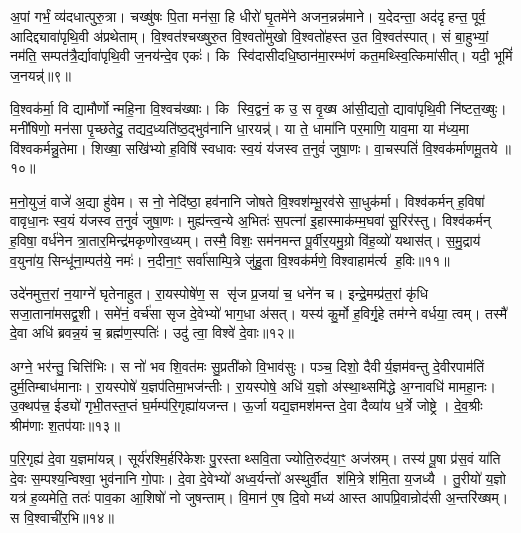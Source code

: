 अ॒पां गर्भं॒ व्य॑दधात्पुरु॒त्रा। चख्षु॑षः पि॒ता मन॑सा॒ हि धीरो॑ घृ॒तमे॑ने अजन॒न्नन्न॑माने। य॒देदन्ता॒ अद॑दृहन्त॒ पूर्व॒ आदिद्द्यावा॑पृथि॒वी अ॑प्रथेताम्। वि॒श्वत॑श्चख्षुरु॒त वि॒श्वतो॑मुखो वि॒श्वतो॑हस्त उ॒त वि॒श्वत॑स्पात्। सं बा॒हुभ्यां॒ नम॑ति॒ सम्पत॑त्रै॒र्द्यावा॑पृथि॒वी ज॒नय॑न्दे॒व एकः॑। कि स्वि॑दासीदधि॒ष्ठान॑मा॒रम्भ॑णं कत॒मथ्स्वि॒त्किमा॑सीत्। यदी॒ भूमिं॑ ज॒नयन्न्॑॥९॥

वि॒श्वक॑र्मा॒ वि द्यामौर्णोन्महि॒ना वि॒श्वच॑ख्षाः। कि स्वि॒द्वनं॒ क उ॒ स वृ॒ख्ष आ॑सी॒द्यतो॒ द्यावा॑पृथि॒वी नि॑ष्टत॒ख्षुः। मनी॑षिणो॒ मन॑सा पृ॒च्छतेदु॒ तद्यद॒ध्यति॑ष्ठ॒द्भुव॑नानि धा॒रयन्न्॑। या ते॒ धामा॑नि पर॒माणि॒ याव॒मा या म॑ध्य॒मा वि॑श्वकर्मन्नु॒तेमा। शिख्षा॒ सखि॑भ्यो ह॒विषि॑ स्वधावः स्व॒यं य॑जस्व त॒नुवं॑ जुषा॒णः। वा॒चस्पतिं॑ वि॒श्वक॑र्माणमू॒तये॥१०॥

म॒नो॒युजं॒ वाजे॑ अ॒द्या हु॑वेम। स नो॒ नेदि॑ष्ठा॒ हव॑नानि जोषते वि॒श्वश॑म्भू॒रव॑से सा॒धुक॑र्मा। विश्व॑कर्मन् ह॒विषा॑ वावृधा॒नः स्व॒यं य॑जस्व त॒नुवं॑ जुषा॒णः। मुह्य॑न्त्व॒न्ये अ॒भितः॑ स॒पत्ना॑ इ॒हास्माक॑म्म॒घवा॑ सू॒रिर॑स्तु। विश्व॑कर्मन् ह॒विषा॒ वर्ध॑नेन त्रा॒तार॒मिन्द्र॑मकृणोरव॒ध्यम्। तस्मै॒ विशः॒ सम॑नमन्त पू॒र्वीर॒यमु॒ग्रो वि॑ह॒व्यो॑ यथास॑त्। स॒मु॒द्राय॑ व॒युना॑य॒ सिन्धू॑ना॒म्पत॑ये॒ नमः॑। न॒दीना॒ꣳ॒ सर्वा॑साम्पि॒त्रे जु॑हु॒ता वि॒श्वक॑र्मणे॒ विश्वाहाम॑र्त्य ह॒विः॥११॥

{\anuvakamend[{ज॒जानै॒नौष॑धीनां॒ भूमिं॑ ज॒नय॑न्नू॒तये॒ नमो॒ नव॑ च॥२॥}]}

उदे॑नमुत्त॒रां न॒याग्ने॑ घृतेनाहुत। रा॒यस्पोषे॑ण॒ स सृ॑ज प्र॒जया॑ च॒ धने॑न च। इन्द्रे॒मम्प्र॑त॒रां कृ॑धि सजा॒ताना॑मसद्व॒शी। समे॑नं॒ वर्च॑सा सृज दे॒वेभ्यो॑ भाग॒धा अ॑सत्। यस्य॑ कु॒र्मो ह॒विर्गृ॒हे तम॑ग्ने वर्धया॒ त्वम्। तस्मै॑ दे॒वा अधि॑ ब्रवन्न॒यं च॒ ब्रह्म॑ण॒स्पतिः॑। उदु॑ त्वा॒ विश्वे॑ दे॒वाः॥१२॥

अग्ने॒ भर॑न्तु॒ चित्ति॑भिः। स नो॑ भव शि॒वत॑मः सु॒प्रती॑को वि॒भाव॑सुः। पञ्च॒ दिशो॒ दैवीर्य॒ज्ञम॑वन्तु दे॒वीरपाम॑तिं दुर्म॒तिम्बाध॑मानाः। रा॒यस्पोषे॑ य॒ज्ञप॑तिमा॒भज॑न्तीः। रा॒यस्पोषे॒ अधि॑ य॒ज्ञो अ॑स्था॒थ्समि॑द्धे अ॒ग्नावधि॑ मामहा॒नः। उ॒क्थप॑त्त्र॒ ईड्यो॑ गृभी॒तस्त॒प्तं घ॒र्मम्प॑रि॒गृह्या॑यजन्त। ऊ॒र्जा यद्य॒ज्ञमश॑मन्त दे॒वा दैव्या॑य ध॒र्त्रे जोष्ट्रे। दे॒व॒श्रीः श्रीम॑णाः श॒तप॑याः॥१३॥

प॒रि॒गृह्य॑ दे॒वा य॒ज्ञमा॑यन्न्। सूर्य॑रश्मि॒र्\mbox{}हरि॑केशः पु॒रस्ताथ्सवि॒ता ज्योति॒रुद॑या॒ꣳ॒ अज॑स्रम्। तस्य॑ पू॒षा प्र॑स॒वं या॑ति दे॒वः स॒म्पश्य॒न्विश्वा॒ भुव॑नानि गो॒पाः। दे॒वा दे॒वेभ्यो॑ अध्व॒र्यन्तो॑ अस्थुर्वी॒त श॑मि॒त्रे श॑मि॒ता य॒जध्यै। तु॒रीयो॑ य॒ज्ञो यत्र॑ ह॒व्यमेति॒ ततः॑ पाव॒का आ॒शिषो॑ नो जुषन्ताम्। वि॒मान॑ ए॒ष दि॒वो मध्य॑ आस्त आपप्रि॒वान्रोद॑सी अ॒न्तरि॑ख्षम्। स वि॒श्वाची॑र॒भि॥१४॥

